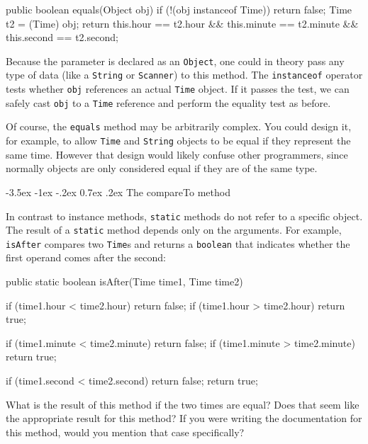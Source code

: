 \documentclass[12pt]{book}
\makeatletter
\theoremstyle{exercise}
\newcommand{\java}[1]{\verb"#1"}
\renewcommand{\section}{\@startsection {section}{1}{\z@}%
    {-3.5ex \@plus -1ex \@minus -.2ex}%
    {0.7ex \@plus.2ex}%
    {\normalfont\Large\bfseries}}
\newcommand{\java}[1]{\lstinline{#1}} %
\makeatother
\begin{document}
\begin{code}
    public boolean equals(Object obj) {
        if (!(obj instanceof Time)) {
            return false;
        }
        Time t2 = (Time) obj;
        return this.hour == t2.hour
            && this.minute == t2.minute
            && this.second == t2.second;
    }
\end{code}

Because the parameter is declared as an \java{Object}, one could in theory pass any type of data (like a \java{String} or \java{Scanner}) to this method.
The \java{instanceof} operator tests whether \java{obj} references an actual \java{Time} object.
If it passes the test, we can safely cast \java{obj} to a \java{Time} reference and perform the equality test as before.

Of course, the \java{equals} method may be arbitrarily complex.
You could design it, for example, to allow \java{Time} and \java{String} objects to be equal if they represent the same time.
However that design would likely confuse other programmers, since normally objects are only considered equal if they are of the same type.


\section{The compareTo method}


In contrast to instance methods, \java{static} methods do not refer to a specific object.
The result of a \java{static} method depends only on the arguments.
For example, \java{isAfter} compares two \java{Time}s and returns a \java{boolean} that indicates whether the first operand comes after the second:

\begin{code}
    public static boolean isAfter(Time time1, Time time2) {
        if (time1.hour < time2.hour) return false;
        if (time1.hour > time2.hour) return true;

        if (time1.minute < time2.minute) return false;
        if (time1.minute > time2.minute) return true;

        if (time1.second < time2.second) return false;
        return true;
    }
\end{code}

What is the result of this method if the two times are equal?
Does that seem like the appropriate result for this method?
If you were writing the documentation for this method, would you mention that case specifically?
\end{document}
